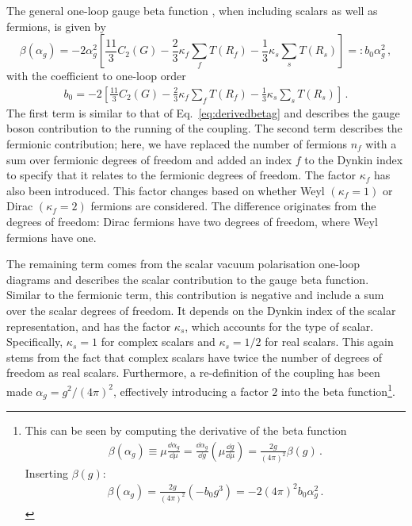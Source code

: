 The general one-loop gauge beta function \cite{Gross:1973ju}, when including scalars as well as fermions, is given by
\begin{equation}
    \beta(\alpha_g)=-{2\alpha_g^2}\left[\frac{11}{3}C_2(G)-\frac{2}{3}\kappa_f\sum_f T(R_f)-\frac{1}{3}\kappa_s\sum_s T(R_s)\right]=:b_0\alpha_g^2\,, \label{eq:betagaugeformula}
\end{equation} 
with the coefficient to one-loop order
\begin{align}
    b_{0}= -2\left[\frac{11}{3}C_2(G)-\frac{2}{3}\kappa_f\sum_f T(R_f)-\frac{1}{3}\kappa_s\sum_s T(R_s)\right]\,.\label{eq:b0def}
\end{align}
The first term is similar to that of Eq.~\eqref{eq:derivedbetag} and describes the gauge boson contribution to the running of the coupling. The second term describes the fermionic contribution; here, we have replaced the number of fermions $n_f$ with a sum over fermionic degrees of freedom and added an index $f$ to the Dynkin index to specify that it relates to the fermionic degrees of freedom. The factor $\kappa_f$ has also been introduced. This factor changes based on whether Weyl $(\kappa_f=1)$ or Dirac $(\kappa_f=2)$ fermions are considered. The difference originates from the degrees of freedom: Dirac fermions have two degrees of freedom, where Weyl fermions have one. 

The remaining term comes from the scalar vacuum polarisation one-loop diagrams and describes the scalar contribution to the gauge beta function. Similar to the fermionic term, this contribution is negative and include a sum over the scalar degrees of freedom. It depends on the Dynkin index of the scalar representation, and has the factor $\kappa_s$, which accounts for the type of scalar. Specifically, $\kappa_s=1$ for complex scalars and $\kappa_s=1/2$ for real scalars. This again stems from the fact that complex scalars have twice the number of degrees of freedom as real scalars. Furthermore, a re-definition of the coupling has been made $\alpha_g=g^2/(4\pi)^2$, effectively introducing a factor $2$ into the beta function\footnote{This can be seen by computing the derivative of the beta function 
\begin{align*}\beta(\alpha_g) \equiv \mu \frac{\dd \alpha_g}{\dd \mu} = \frac{\dd \alpha_g}{\dd g} \left( \mu \frac{\dd g}{\dd \mu} \right)=\frac{2g}{(4\pi)^2} \beta(g)\,.\end{align*} 
Inserting $\beta(g)$:
\begin{align*}\beta(\alpha_g) = \frac{2g}{(4\pi)^2}(-b_0 g^3) = -2(4\pi)^2 b_0 \alpha_g^2\,.\end{align*} 
}.

